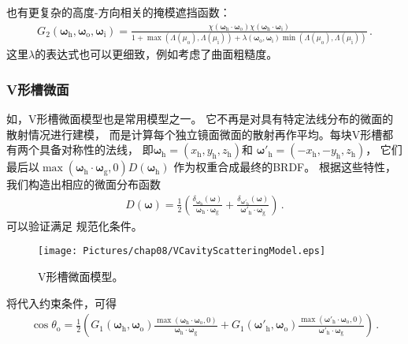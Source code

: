 也有更复杂的高度-方向相关的掩模遮挡函数：
\begin{align}
    G_2({\bm\omega}_{\mathrm{h}},{\bm\omega}_{\mathrm{o}},{\bm\omega}_{\mathrm{i}})
    =\frac{\chi({\bm\omega}_{\mathrm{h}}\cdot{\bm\omega}_{\mathrm{o}})\chi({\bm\omega}_{\mathrm{h}}\cdot{\bm\omega}_{\mathrm{i}})}
    {1+\max(\Lambda(\mu_{\mathrm{o}}),\Lambda(\mu_{\mathrm{i}}))
    +\lambda({\bm\omega}_{\mathrm{o}},{\bm\omega}_{\mathrm{i}})
    \min(\Lambda(\mu_{\mathrm{o}}),\Lambda(\mu_{\mathrm{i}}))}\, .
\end{align}
这里$\lambda$的表达式也可以更细致，例如\citet{Heitz01082013}考虑了曲面粗糙度。

\subsubsection*{V形槽微面}
如，V形槽微面模型也是常用模型之一。
它不再是对具有特定法线分布的微面的散射情况进行建模，
而是计算每个独立镜面微面的散射再作平均。每块V形槽都有两个具备对称性的法线，
即${\bm\omega}_{\mathrm{h}}=(x_{\mathrm{h}},y_{\mathrm{h}},z_{\mathrm{h}})$和
${\bm\omega}'_{\mathrm{h}}=(-x_{\mathrm{h}},-y_{\mathrm{h}},z_{\mathrm{h}})$，
它们最后以$\max({\bm\omega}_{\mathrm{h}}\cdot{\bm\omega}_{\mathrm{g}},0)D({\bm\omega}_{\mathrm{h}})$
作为权重合成最终的BRDF。
根据这些特性，我们构造出相应的微面分布函数
\begin{align}\label{eq:08ex01-VCavityScatteringNormalDistribution}
    D({\bm\omega})=\frac{1}{2}\left(
    \frac{\delta_{{\bm\omega}_{\mathrm{h}}}({\bm\omega})}
    {{\bm\omega}_{\mathrm{h}}\cdot{\bm\omega}_{\mathrm{g}}}
    +\frac{\delta_{{\bm\omega}'_{\mathrm{h}}}({\bm\omega})}
    {{\bm\omega}'_{\mathrm{h}}\cdot{\bm\omega}_{\mathrm{g}}}\right)\, .
\end{align}
可以验证满足
规范化条件。

\begin{figure}[htbp]
    \centering
    \texttt{[image: Pictures/chap08/VCavityScatteringModel.eps]}
    \caption{V形槽微面模型。}
    \label{fig:08ex01-V-cavityScatteringModel}
\end{figure}

将代入约束条件，可得
\begin{align}\label{eq:08ex01-V-Cavity-configurations}
    \cos\theta_{\mathrm{o}}=\frac{1}{2}\left(
    G_1({\bm\omega}_{\mathrm{h}},{\bm\omega}_{\mathrm{o}})
    \frac{\max({\bm\omega}_{\mathrm{h}}\cdot{\bm\omega}_{\mathrm{o}},0)}
    {{\bm\omega}_{\mathrm{h}}\cdot{\bm\omega}_{\mathrm{g}}}
    +G_1({\bm\omega}'_{\mathrm{h}},{\bm\omega}_{\mathrm{o}})
    \frac{\max({\bm\omega}'_{\mathrm{h}}\cdot{\bm\omega}_{\mathrm{o}},0)}
    {{\bm\omega}'_{\mathrm{h}}\cdot{\bm\omega}_{\mathrm{g}}}\right)\, .
\end{align}

